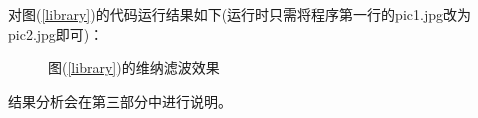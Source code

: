 \documentclass[UTF8]{ctexart}
\begin{document}
    对图(\ref{library})的代码运行结果如下(运行时只需将程序第一行的{\ttfamily pic1.jpg}改为{\ttfamily pic2.jpg}即可)：
    \begin{figure}[htbp]
        \centering
        \caption{图(\ref{library})的维纳滤波效果}
        \label{libraryweina1}
    \end{figure}

    结果分析会在第三部分中进行说明。
    \clearpage
\end{document}
